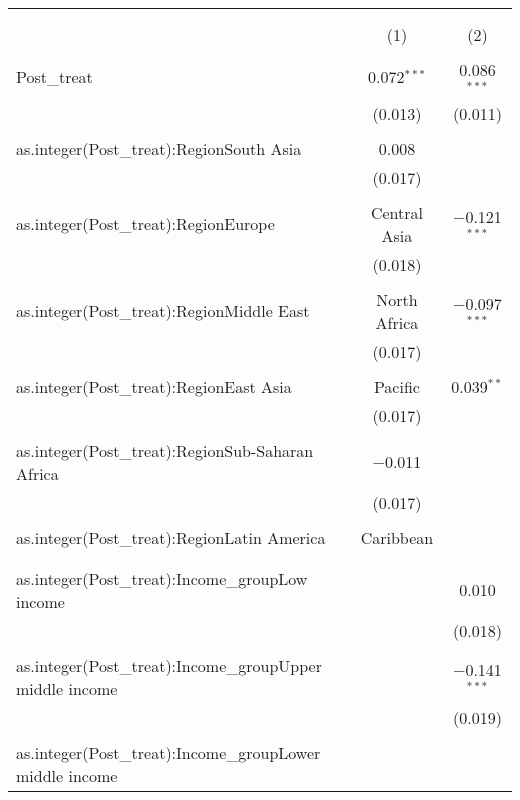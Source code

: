 
\begin{table}[!htbp] \centering 
  \caption{} 
  \label{} 
\begin{tabular}{@{\extracolsep{5pt}}lcc} 
\\[-1.8ex]\hline 
\hline \\[-1.8ex] 
\\[-1.8ex] & (1) & (2)\\ 
\hline \\[-1.8ex] 
 Post\_treat & 0.072$^{***}$ & 0.086$^{***}$ \\ 
  & (0.013) & (0.011) \\ 
  & & \\ 
 as.integer(Post\_treat):RegionSouth Asia & 0.008 &  \\ 
  & (0.017) &  \\ 
  & & \\ 
 as.integer(Post\_treat):RegionEurope & Central Asia & $-$0.121$^{***}$ &  \\ 
  & (0.018) &  \\ 
  & & \\ 
 as.integer(Post\_treat):RegionMiddle East & North Africa & $-$0.097$^{***}$ &  \\ 
  & (0.017) &  \\ 
  & & \\ 
 as.integer(Post\_treat):RegionEast Asia & Pacific & 0.039$^{**}$ &  \\ 
  & (0.017) &  \\ 
  & & \\ 
 as.integer(Post\_treat):RegionSub-Saharan Africa & $-$0.011 &  \\ 
  & (0.017) &  \\ 
  & & \\ 
 as.integer(Post\_treat):RegionLatin America & Caribbean &  &  \\ 
  &  &  \\ 
  & & \\ 
 as.integer(Post\_treat):Income\_groupLow income &  & 0.010 \\ 
  &  & (0.018) \\ 
  & & \\ 
 as.integer(Post\_treat):Income\_groupUpper middle income &  & $-$0.141$^{***}$ \\ 
  &  & (0.019) \\ 
  & & \\ 
 as.integer(Post\_treat):Income\_groupLower middle income &  &  \\ 

\end{tabular}
\end{table}
